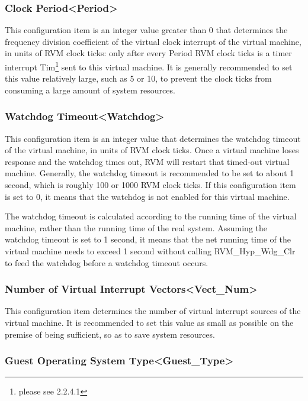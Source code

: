 \subsubsection{Clock Period<Period>{}}\label{subsubsec:5-3-15-5}

This configuration item is an integer value greater than 0 that determines the frequency division coefficient of the virtual clock interrupt of the virtual machine, in units of RVM clock ticks: only after every Period RVM clock ticks is a timer interrupt Tim\footnote{please see 2.2.4.1} sent to this virtual machine. It is generally recommended to set this value relatively large, such as 5 or 10, to prevent the clock ticks from consuming a large amount of system resources.

\subsubsection{Watchdog Timeout<Watchdog>{}}\label{subsubsec:5-3-15-6}

This configuration item is an integer value that determines the watchdog timeout of the virtual machine, in units of RVM clock ticks. Once a virtual machine loses response and the watchdog times out, RVM will restart that timed-out virtual machine. Generally, the watchdog timeout is recommended to be set to about 1 second, which is roughly 100 or 1000 RVM clock ticks. If this configuration item is set to 0, it means that the watchdog is not enabled for this virtual machine.

The watchdog timeout is calculated according to the running time of the virtual machine, rather than the running time of the real system. Assuming the watchdog timeout is set to 1 second, it means that the net running time of the virtual machine needs to exceed 1 second without calling RVM\_Hyp\_Wdg\_Clr to feed the watchdog before a watchdog timeout occurs.

\subsubsection{Number of Virtual Interrupt Vectors<Vect\_Num>{}}\label{subsubsec:5-3-15-7}

This configuration item determines the number of virtual interrupt sources of the virtual machine. It is recommended to set this value as small as possible on the premise of being sufficient, so as to save system resources.

\subsubsection{Guest Operating System Type<Guest\_Type>{}}\label{subsubsec:5-3-15-8}

